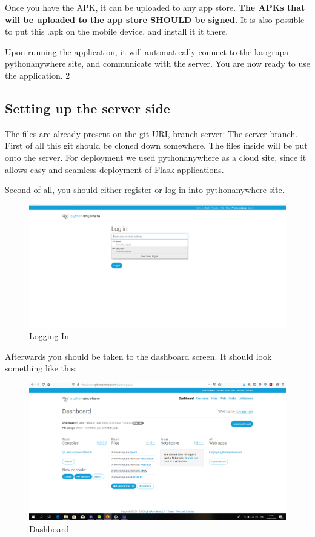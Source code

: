 			Once you have the APK, it can be uploaded to any app store. \textbf{The APKs that will be uploaded to the app store SHOULD be signed.} It is also possible to put this .apk on the mobile device, and install it it there.
			
			Upon running the application, it will automatically connect to the kaogrupa pythonanywhere site, and communicate with the server. You are now ready to use the application. 2
			
			\subsection{Setting up the server side}
				
				The files are already present on the git URI, branch server: \href{https://gitlab.com/barbil/organization_of_the_festival/tree/server}{The server branch}. First of all this git should be cloned down somewhere. The files inside will be put onto the server. For deployment we used pythonanywhere as a cloud site, since it allows easy and seamless deployment of Flask applications.
				
				Second of all, you should either register or log in into pythonanywhere site.
				\begin{figure}[H]
					\includegraphics[width=\linewidth]{images/Deploy_1.png}
					\caption{Logging-In}
					\label{fig:deployment_1}
				\end{figure}
			
				Afterwards you should be taken to the dashboard screen. It should look something like this:
				\begin{figure}[H]
					\includegraphics[width=\linewidth]{images/Deploy_2.png}
					\caption{Dashboard}
					\label{fig:deployment_2}
				\end{figure}
				
